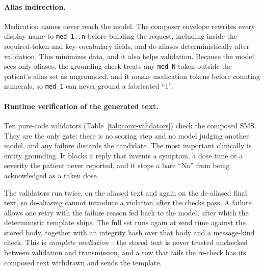 \paragraph{Alias indirection.}
Medication names never reach the model. The composer envelope rewrites every
display name to \texttt{med\_1..n} before building the request, including inside
the required-token and key-vocabulary fields, and de-aliases deterministically
after validation. This minimizes data, and it also helps validation. Because the
model sees only aliases, the grounding check treats any \texttt{med\_N} token
outside the patient's alias set as ungrounded, and it masks medication tokens
before counting numerals, so \texttt{med\_1} can never ground a fabricated ``1''.

\paragraph{Runtime verification of the generated text.}
Ten pure-code validators (Table~\ref{tab:conv-validators}) check the composed
SMS. They are the only gate: there is no scoring step and no model judging
another model, and any failure discards the candidate. The most important
clinically is entity grounding. It blocks a reply that invents a symptom, a dose
time or a severity the patient never reported, and it stops a bare ``No'' from
being acknowledged as a taken dose.

The validators run twice, on the aliased text and again on the de-aliased final
text, so de-aliasing cannot introduce a violation after the checks pass. A
failure allows one retry with the failure reason fed back to the model, after
which the deterministic template ships. The full set runs again at send time
against the stored body, together with an integrity hash over that body and a
message-kind check. This is \emph{complete mediation}~\cite{saltzer1975protection}:
the stored text is never trusted unchecked between validation and transmission,
and a row that fails the re-check has its composed text withdrawn and sends the
template.

